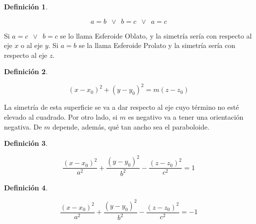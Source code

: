 \documentclass[a5paper,12pt,twoside]{book}
\newtheorem{defn}{{Definición}}[chapter]
\begin{document}
\begin{mdframed}[style=MyFrame1]
    \begin{defn}
    \end{defn}
    \begin{equation*}
        a=b \enspace \lor \enspace b=c \enspace \lor \enspace a=c
    \end{equation*}
\end{mdframed}

Si $a=c \enspace \lor \enspace b=c$ se lo llama Esferoide Oblato, y la simetría sería con respecto al eje $x$ o al eje $y$. Si $a=b$ se la llama Esferoide Prolato y la simetría sería con respecto al eje $z$.

\begin{mdframed}[style=MyFrame1]
    \begin{defn}
    \end{defn}
    \begin{equation*}
        (x-x_0)^2 + (y-y_0)^2 = m(z-z_0)
    \end{equation*}
\end{mdframed}

La simetría de esta superficie se va a dar respecto al eje cuyo término no esté elevado al cuadrado. Por otro lado, si $m$ es negativo va a tener una orientación negativa. De $m$ depende, además, qué tan ancho sea el paraboloide.

\begin{mdframed}[style=MyFrame1]
    \begin{defn}
    \end{defn}
    \begin{equation*}
        \dfrac{(x-x_0)^2}{a^2} + \dfrac{(y-y_0)^2}{b^2} - \dfrac{(z-z_0)^2}{c^2} = 1
    \end{equation*}
\end{mdframed}

\begin{mdframed}[style=MyFrame1]
    \begin{defn}
    \end{defn}
    \begin{equation*}
        \dfrac{(x-x_0)^2}{a^2} + \dfrac{(y-y_0)^2}{b^2} - \dfrac{(z-z_0)^2}{c^2} = -1
    \end{equation*}
\end{mdframed}

\end{document}
